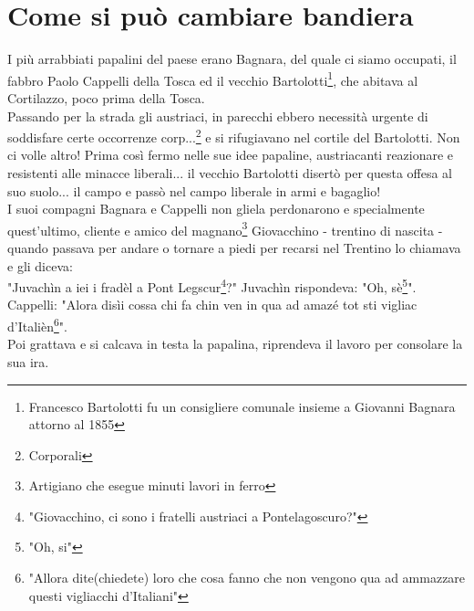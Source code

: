 
\chapter{Come si può cambiare bandiera}
I più arrabbiati papalini del paese erano Bagnara, del quale ci siamo occupati, il fabbro Paolo Cappelli della Tosca ed il vecchio Bartolotti\footnote{Francesco Bartolotti fu un consigliere comunale insieme a Giovanni Bagnara attorno al 1855}, che abitava al Cortilazzo, poco prima della Tosca. \\
Passando per la strada gli austriaci, in parecchi ebbero necessità urgente di soddisfare certe occorrenze corp...\footnote{Corporali} e si rifugiavano nel cortile del Bartolotti. Non ci volle altro! Prima così fermo nelle sue idee papaline, austriacanti reazionare e resistenti alle minacce liberali... il vecchio Bartolotti disertò per questa offesa al suo suolo... il campo e passò nel campo liberale in armi e bagaglio!\\
I suoi compagni Bagnara e Cappelli non gliela perdonarono e specialmente quest'ultimo, cliente e amico del magnano\footnote{Artigiano che esegue minuti lavori in ferro} Giovacchino -  trentino di nascita - quando passava per andare o tornare a piedi per recarsi nel Trentino lo chiamava e gli diceva:\\
"Juvachìn a iei i fradèl a Pont Legscur\footnote{"Giovacchino, ci sono i fratelli austriaci a Pontelagoscuro?"}?"
Juvachìn rispondeva: "Oh, sè\footnote{"Oh, si"}".
Cappelli: "Alora disìi cossa chi fa chin ven in qua ad amazé tot sti vigliac d'Italièn\footnote{"Allora dite(chiedete) loro che cosa fanno che non vengono qua ad ammazzare questi vigliacchi d'Italiani"}".\\
Poi grattava e si calcava in testa la papalina, riprendeva il lavoro per consolare la sua ira.


